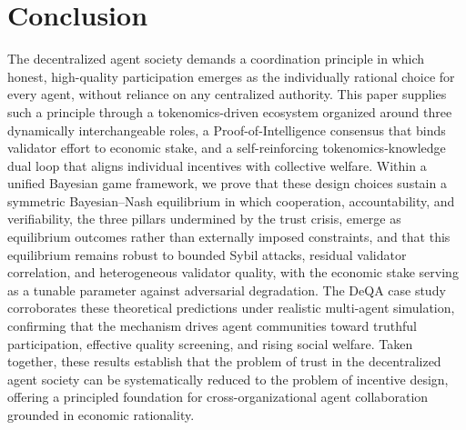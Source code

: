 \section{Conclusion}
\label{sec:conclusion}

The decentralized agent society demands a coordination principle in which honest, high-quality participation emerges as the individually rational choice for every agent, without reliance on any centralized authority. This paper supplies such a principle through a tokenomics-driven ecosystem organized around three dynamically interchangeable roles, a Proof-of-Intelligence consensus that binds validator effort to economic stake, and a self-reinforcing tokenomics-knowledge dual loop that aligns individual incentives with collective welfare. Within a unified Bayesian game framework, we prove that these design choices sustain a symmetric Bayesian--Nash equilibrium in which cooperation, accountability, and verifiability, the three pillars undermined by the trust crisis, emerge as equilibrium outcomes rather than externally imposed constraints, and that this equilibrium remains robust to bounded Sybil attacks, residual validator correlation, and heterogeneous validator quality, with the economic stake serving as a tunable parameter against adversarial degradation. The DeQA case study corroborates these theoretical predictions under realistic multi-agent simulation, confirming that the mechanism drives agent communities toward truthful participation, effective quality screening, and rising social welfare. Taken together, these results establish that the problem of trust in the decentralized agent society can be systematically reduced to the problem of incentive design, offering a principled foundation for cross-organizational agent collaboration grounded in economic rationality.
